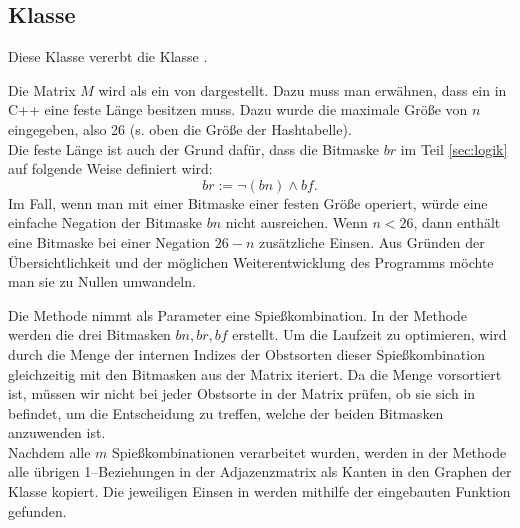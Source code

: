 \subsection{Klasse }
Diese Klasse vererbt die Klasse .

Die Matrix $M$ wird als ein  von  dargestellt.
Dazu muss man erwähnen, dass ein  in C++ eine feste Länge besitzen muss.
Dazu wurde die maximale Größe von $n$ eingegeben, also 26 (s. oben die Größe der Hashtabelle).\\
Die feste Länge ist auch der Grund dafür, dass die Bitmaske $br$ im Teil \ref{sec:logik}
auf folgende Weise definiert wird:
\[
br := \neg(bn) \land bf.
\]
Im Fall, wenn man mit einer Bitmaske einer festen Größe operiert, würde 
eine einfache Negation der Bitmaske $bn$ nicht ausreichen. Wenn $n < 26$, dann enthält 
eine Bitmaske bei einer Negation $26 - n$ zusätzliche Einsen. Aus Gründen der Übersichtlichkeit 
und der möglichen Weiterentwicklung des Programms möchte man sie zu Nullen umwandeln.





Die Methode  nimmt als Parameter eine Spießkombination. 
In der Methode werden die drei Bitmasken $bn, br, bf$ erstellt.
Um die Laufzeit zu optimieren, wird durch die Menge der internen Indizes der Obstsorten 
dieser Spießkombination  gleichzeitig mit den Bitmasken aus der Matrix iteriert.
Da die Menge  vorsortiert ist, müssen wir nicht bei jeder Obstsorte in der Matrix
prüfen, ob sie sich in  befindet, um die Entscheidung zu treffen, welche der beiden
Bitmasken anzuwenden ist.\\
Nachdem alle $m$ Spießkombinationen verarbeitet wurden, werden in der Methode 
alle übrigen 1--Beziehungen in der Adjazenzmatrix
als Kanten in den Graphen  der Klasse  kopiert. 
Die jeweiligen Einsen in  werden mithilfe der eingebauten Funktion 
gefunden.

